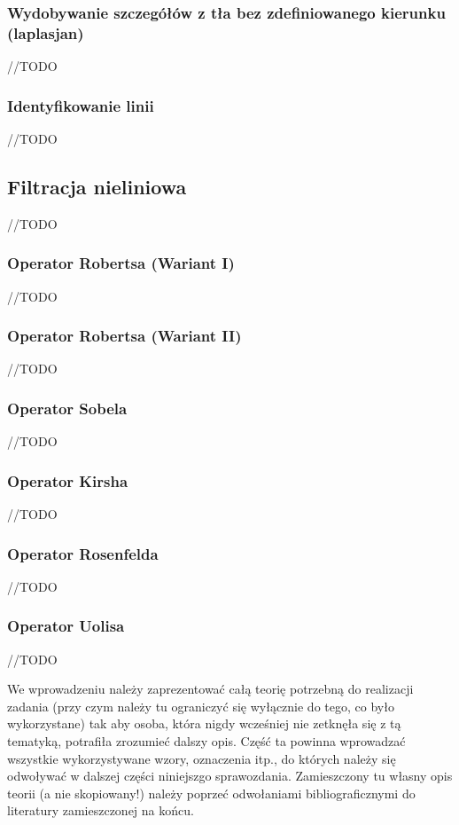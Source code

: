 \documentclass{classrep}
\begin{document}
\subsubsection{Wydobywanie szczegółów z tła bez zdefiniowanego kierunku (laplasjan)}
//TODO

\subsubsection{Identyfikowanie linii}
//TODO

\subsection{Filtracja nieliniowa}
//TODO

\subsubsection{Operator Robertsa (Wariant I)}
//TODO

\subsubsection{Operator Robertsa (Wariant II)}
//TODO

\subsubsection{Operator Sobela}
//TODO

\subsubsection{Operator Kirsha}
//TODO

\subsubsection{Operator Rosenfelda}
//TODO

\subsubsection{Operator Uolisa}
//TODO

{\color{blue}
We wprowadzeniu należy zaprezentować całą teorię potrzebną do realizacji
zadania (przy czym należy tu ograniczyć się wyłącznie do tego, co było
wykorzystane) tak aby osoba, która nigdy wcześniej nie zetknęła się z tą
tematyką, potrafiła zrozumieć dalszy opis. Część ta powinna wprowadzać
wszystkie wykorzystywane wzory, oznaczenia itp., do których należy się
odwoływać w dalszej części niniejszgo sprawozdania. Zamieszczony tu własny
opis teorii (a nie skopiowany!) należy poprzeć odwołaniami bibliograficznymi
do literatury zamieszczonej na końcu. }
\end{document}
